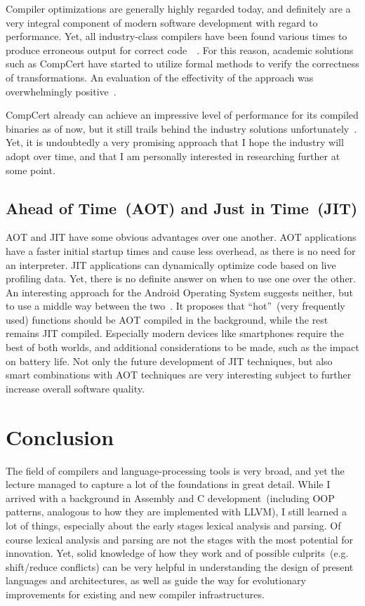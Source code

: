 \documentclass[]{tukportfolio}
\begin{document}
Compiler optimizations are generally highly regarded today, and definitely are a very integral component of modern software development with regard to performance. Yet, all industry-class compilers have been found various times to produce erroneous output for correct code~\cite{cbugs}~\cite{msvcfixes}.
For this reason, academic solutions such as CompCert have started to utilize formal methods to verify the correctness of transformations. An evaluation of the effectivity of the approach was overwhelmingly positive~\cite{cbugs}.

CompCert already can achieve an impressive level of performance for its compiled binaries as of now, but it still trails behind the industry solutions unfortunately~\cite{compcert}. Yet, it is undoubtedly a very promising approach that I hope the industry will adopt over time, and that I am personally interested in researching further at some point.

\subsection{Ahead of Time~(AOT) and Just in Time~(JIT)}

AOT and JIT have some obvious advantages over one another. AOT applications have a faster initial startup times and cause less overhead, as there is no need for an interpreter. JIT applications can dynamically optimize code based on live profiling data. Yet, there is no definite answer on when to use one over the other. An interesting approach for the Android Operating System suggests neither, but to use a middle way between the two~\cite{aotjitpaper}. It proposes that ``hot''~(very frequently used) functions should be AOT compiled in the background, while the rest remains JIT compiled. Especially modern devices like smartphones require the best of both worlds, and additional considerations to be made, such as the impact on battery life. Not only the future development of JIT techniques, but also smart combinations with AOT techniques are very interesting subject to further increase overall software quality.

\newpage
\section{Conclusion}

The field of compilers and language-processing tools is very broad, and yet the lecture managed to capture a lot of the foundations in great detail. While I arrived with a background in Assembly and C development~(including OOP patterns, analogous to how they are implemented with LLVM), I still learned a lot of things, especially about the early stages lexical analysis and parsing. Of course lexical analysis and parsing are not the stages with the most potential for innovation. Yet, solid knowledge of how they work and of possible culprits~(e.g. shift/reduce conflicts) can be very helpful in understanding the design of present languages and architectures, as well as guide the way for evolutionary improvements for existing and new compiler infrastructures.
\end{document}

